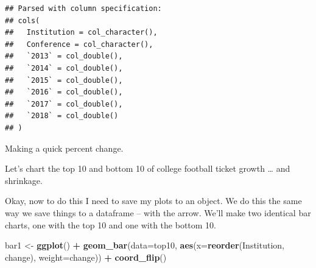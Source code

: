 \documentclass[
]{book}
\newenvironment{Shaded}{\begin{snugshade}}{\end{snugshade}}
\newcommand{\DataTypeTok}[1]{\textcolor[rgb]{0.13,0.29,0.53}{#1}}
\newcommand{\DecValTok}[1]{\textcolor[rgb]{0.00,0.00,0.81}{#1}}
\newcommand{\KeywordTok}[1]{\textcolor[rgb]{0.13,0.29,0.53}{\textbf{#1}}}
\newcommand{\NormalTok}[1]{#1}
\newcommand{\OperatorTok}[1]{\textcolor[rgb]{0.81,0.36,0.00}{\textbf{#1}}}
\newcommand{\StringTok}[1]{\textcolor[rgb]{0.31,0.60,0.02}{#1}}
\begin{document}
\begin{verbatim}
## Parsed with column specification:
## cols(
##   Institution = col_character(),
##   Conference = col_character(),
##   `2013` = col_double(),
##   `2014` = col_double(),
##   `2015` = col_double(),
##   `2016` = col_double(),
##   `2017` = col_double(),
##   `2018` = col_double()
## )
\end{verbatim}

Making a quick percent change.

\begin{Shaded}
\end{Shaded}

Let's chart the top 10 and bottom 10 of college football ticket growth \ldots{} and shrinkage.

\begin{Shaded}
\end{Shaded}

Okay, now to do this I need to save my plots to an object. We do this the same way we save things to a dataframe -- with the arrow. We'll make two identical bar charts, one with the top 10 and one with the bottom 10.

\begin{Shaded}
\begin{Highlighting}[]
\NormalTok{bar1 <-}\StringTok{ }\KeywordTok{ggplot}\NormalTok{() }\OperatorTok{+}\StringTok{ }\KeywordTok{geom_bar}\NormalTok{(}\DataTypeTok{data=}\NormalTok{top10, }\KeywordTok{aes}\NormalTok{(}\DataTypeTok{x=}\KeywordTok{reorder}\NormalTok{(Institution, change), }\DataTypeTok{weight=}\NormalTok{change)) }\OperatorTok{+}\StringTok{ }\KeywordTok{coord_flip}\NormalTok{()}
\end{Highlighting}
\end{Shaded}
\end{document}
